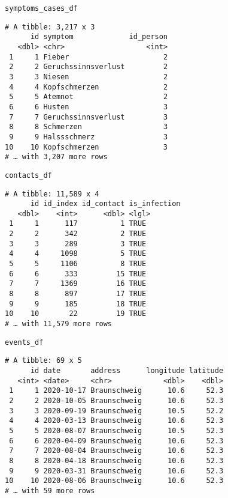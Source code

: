\documentclass[
  8pt,
  ignorenonframetext,
]{beamer}
\begin{document}
\begin{frame}[fragile]
\texttt{symptoms\_cases\_df}

\vspace{0.2cm}

\tiny

\begin{verbatim}
# A tibble: 3,217 x 3
      id symptom             id_person
   <dbl> <chr>                   <int>
 1     1 Fieber                      2
 2     2 Geruchssinnsverlust         2
 3     3 Niesen                      2
 4     4 Kopfschmerzen               2
 5     5 Atemnot                     2
 6     6 Husten                      3
 7     7 Geruchssinnsverlust         3
 8     8 Schmerzen                   3
 9     9 Halssschmerz                3
10    10 Kopfschmerzen               3
# … with 3,207 more rows
\end{verbatim}

\normalsize
\end{frame}

\begin{frame}[fragile]
\texttt{contacts\_df}

\vspace{0.2cm}

\tiny

\begin{verbatim}
# A tibble: 11,589 x 4
      id id_index id_contact is_infection
   <dbl>    <int>      <dbl> <lgl>       
 1     1      117          1 TRUE        
 2     2      342          2 TRUE        
 3     3      289          3 TRUE        
 4     4     1098          5 TRUE        
 5     5     1106          8 TRUE        
 6     6      333         15 TRUE        
 7     7     1369         16 TRUE        
 8     8      897         17 TRUE        
 9     9      185         18 TRUE        
10    10       22         19 TRUE        
# … with 11,579 more rows
\end{verbatim}

\normalsize
\end{frame}

\begin{frame}[fragile]
\texttt{events\_df}

\vspace{0.2cm}

\tiny

\begin{verbatim}
# A tibble: 69 x 5
      id date       address      longitude latitude
   <int> <date>     <chr>            <dbl>    <dbl>
 1     1 2020-10-17 Braunschweig      10.6     52.3
 2     2 2020-10-05 Braunschweig      10.6     52.3
 3     3 2020-09-19 Braunschweig      10.5     52.2
 4     4 2020-03-13 Braunschweig      10.6     52.3
 5     5 2020-08-07 Braunschweig      10.5     52.3
 6     6 2020-04-09 Braunschweig      10.6     52.3
 7     7 2020-08-04 Braunschweig      10.6     52.3
 8     8 2020-04-18 Braunschweig      10.6     52.3
 9     9 2020-03-31 Braunschweig      10.6     52.3
10    10 2020-08-06 Braunschweig      10.6     52.3
# … with 59 more rows
\end{verbatim}

\normalsize
\end{frame}
\end{document}
